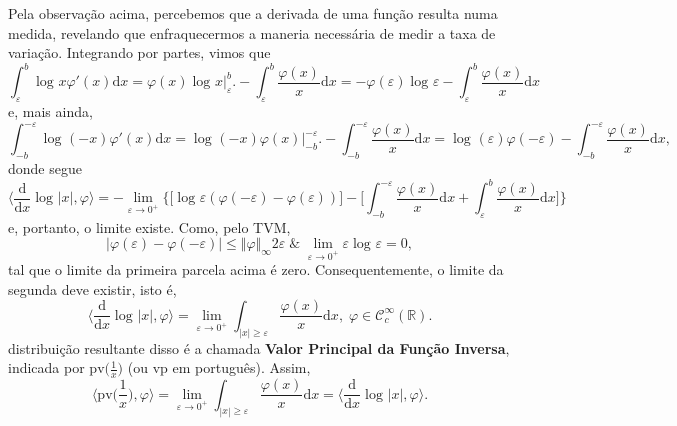 \documentclass[../distribution_theory_notes.tex]{subfiles}
\begin{document}
Pela observação acima, percebemos que a derivada de uma função resulta numa medida, revelando que enfraquecermos a maneria necessária de medir a taxa de variação. Integrando por partes, vimos que
\[
	\int_{\varepsilon }^{b}\log^{}{x}\varphi '(x) \mathrm{d}x = \varphi (x)\log^{}{x}\biggl|_{\varepsilon }^{b}\biggr. - \int_{\varepsilon }^{b}\frac{\varphi (x) }{x} \mathrm{d}x = -\varphi (\varepsilon )\log^{}{\varepsilon }- \int_{\varepsilon }^{b}\frac{\varphi (x)}{x} \mathrm{d}x
\]
e, mais ainda,
\[
	\int_{-b}^{-\varepsilon }\log^{}{(-x)}\varphi'(x) \mathrm{d}x = \log^{}{(-x)}\varphi (x)\biggl|_{-b}^{-\varepsilon }\biggr. - \int_{-b}^{-\varepsilon }\frac{\varphi (x)}{x} \mathrm{d}x = \log^{}{(\varepsilon )} \varphi (-\varepsilon )- \int_{-b}^{-\varepsilon }\frac{\varphi (x)}{x} \mathrm{d}x,
\]
donde segue
\[
	\biggl\langle \frac{\mathrm{d}}{\mathrm{d}x}\log^{}{| x |}, \varphi  \biggr\rangle = - \lim_{\varepsilon \to 0^{+}}\biggl\{\biggl[\log^{}{\varepsilon }(\varphi (-\varepsilon )-\varphi(\varepsilon ))\biggr]-\biggl[\int_{-b}^{-\varepsilon }\frac{\varphi(x)}{x} \mathrm{d}x + \int_{\varepsilon }^{b}\frac{\varphi (x)}{x} \mathrm{d}x\biggr]\biggr\}
\]
e, portanto, o limite existe. Como, pelo TVM,
\[
	| \varphi (\varepsilon )-\varphi (-\varepsilon ) | \leq \Vert \varphi  \Vert_{\infty} 2\varepsilon \;\&\; \lim_{\varepsilon \to 0^{+}} \varepsilon \log^{}{\varepsilon }=0,
\]
tal que o limite da primeira parcela acima é zero. Consequentemente, o limite da segunda deve existir, isto é,
\[
	\biggl\langle \frac{\mathrm{d}}{\mathrm{d}x} \log^{}{| x |}, \varphi  \biggr\rangle = \lim_{\varepsilon \to 0^{+}} \int_{| x |\geq \varepsilon }^{}\frac{\varphi (x)}{x} \mathrm{d}x,\; \varphi \in \mathcal{C}_{c}^{\infty}(\mathbb{R}).
\]
distribuição resultante disso é a chamada \textbf{Valor Principal da Função Inversa}, indicada por \(\mathrm{pv}\bigl(\frac{1}{x}\bigr)\) (ou \(\mathrm{vp}\) em português). Assim,
\[
	\biggl\langle \mathrm{pv}\bigl(\frac{1}{x}\bigr), \varphi  \biggr\rangle = \lim_{\varepsilon \to 0^{+}} \int_{| x |\geq \varepsilon }^{}\frac{\varphi (x)}{x} \mathrm{d}x = \biggl\langle \frac{\mathrm{d}}{\mathrm{d}x}\log^{}{|x|}, \varphi \biggr\rangle.
\]
\end{document}
